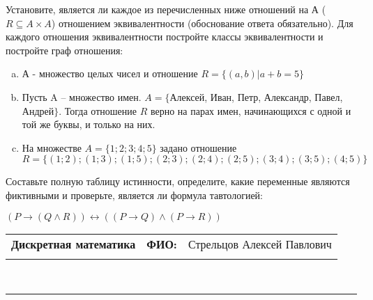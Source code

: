 \documentclass[10pt]{exam}
\newcommand{\class}{Дискретная математика}
\newcommand{\examdate}{}
\begin{document}
\begin{questions}
\question
Установите, является ли каждое из перечисленных ниже отношений на А ($R \subseteq A \times A$) отношением эквивалентности (обоснование ответа обязательно). Для каждого отношения эквивалентности постройте классы 
эквивалентности и постройте граф отношения:
\begin{enumerate} [a)]\setcounter{enumi}{0}
\item А - множество целых чисел и отношение $R = \{(a,b)|a + b = 5\}$
\item Пусть A – множество имен. $A = \{ $Алексей, Иван, Петр, Александр, Павел, Андрей$ \}$. Тогда отношение $R $ верно на парах имен, начинающихся с одной и той же буквы, и только на них.
\item На множестве $A = \{1; 2; 3; 4; 5\}$ задано отношение $R = \{(1; 2); (1; 3); (1; 5); (2; 3); (2; 4); (2; 5); (3; 4); (3; 5); (4; 5)\}$
\end{enumerate}\question Составьте полную таблицу истинности, определите, какие переменные являются фиктивными и проверьте, является ли формула тавтологией:

$(P \rightarrow (Q \land R)) \leftrightarrow ((P \rightarrow Q) \land (P \rightarrow R))$

\end{questions}
\newpage
\begin{flushright}
\begin{tabular}{p{2.8in} r l}
\textbf{\class} & \textbf{ФИО:} &Стрельцов Алексей Павлович
\\

\textbf{\examdate} &&\\
\end{tabular}\\
\end{flushright}
\rule[1ex]{\textwidth}{.1pt}
\end{document}

